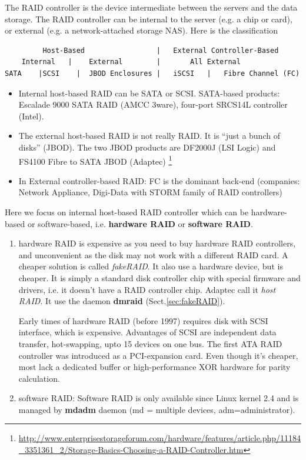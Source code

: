 The RAID controller is the device intermediate between the servers and the data
storage. The RAID controller can be internal to the server (e.g. a chip or
card), or external (e.g. a network-attached storage NAS). Here is the
classification
\begin{verbatim}
         Host-Based   	         	|	External Controller-Based
    Internal   |	External   	    |     	All External
SATA 	|SCSI    |	JBOD Enclosures |	iSCSI 	|   Fibre Channel (FC)
\end{verbatim}

\begin{itemize}
  \item Internal host-based RAID can be SATA or SCSI. SATA-based products:
  Escalade 9000 SATA RAID (AMCC 3ware), four-port SRCS14L controller (Intel).
  
  \item The external host-based RAID is not really RAID. It is ``just a bunch of disks''
(JBOD). The two JBOD products are DF2000J (LSI Logic) and FS4100 Fibre to SATA
JBOD (Adaptec)
\footnote{\url{http://www.enterprisestorageforum.com/hardware/features/article.php/11184_3351361_2/Storage-Basics-Choosing-a-RAID-Controller.htm}}
  
  \item In External controller-based RAID: FC is the dominant back-end
  (companies: Network Appliance, Digi-Data with STORM family of RAID
  controllers)
\end{itemize}

Here we focus on internal host-based RAID controller which can be hardware-based
or software-based, i.e.  {\bf hardware RAID} or {\bf software RAID}.
\begin{enumerate}
  \item hardware RAID is expensive as you need to buy hardware RAID controllers,
  and unconvenient as the disk may not work with a different RAID card. A
  cheaper solution is called {\it fakeRAID}. It also use a hardware device, but
  is cheaper. It is simply a standard disk controller chip with special firmware
  and drivers, i.e. it doesn't have a RAID controller chip.  Adaptec call it
  {\it host RAID}. It use the daemon {\bf dmraid} (Sect.\ref{sec:fakeRAID}).

Early times of hardware RAID (before 1997) requires disk with SCSI interface,
which is expensive. Advantages of SCSI are independent data transfer, hot-swapping, upto
15 devices on one bus.	The first ATA RAID controller was introduced as a
PCI-expansion card. Even though it's cheaper, most lack a dedicated buffer or
high-performance XOR hardware for parity calculation. 	


  \item software RAID:  Software RAID is only available since Linux kernel 2.4
  and is managed by {\bf mdadm} daemon (md = multiple devices,
  adm=administrator).
\end{enumerate}
 

